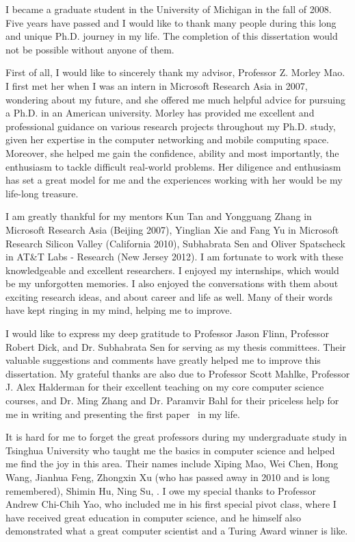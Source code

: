 \startacknowledgementspage

I became a graduate student in the University of Michigan in the fall of 2008. Five years have passed and I would like to thank many people during this long and unique Ph.D. journey in my life. The completion of this dissertation would not be possible without anyone of them.

First of all, I would like to sincerely thank my advisor, Professor Z. Morley Mao. I first met her when I was an intern in Microsoft Research Asia in 2007, wondering about my future, and she offered me much helpful advice for pursuing a Ph.D. in an American university. Morley has provided me excellent and professional guidance on various research projects throughout my Ph.D. study, given her expertise in the computer networking and mobile computing space. Moreover, she helped me gain the confidence, ability and most importantly, the enthusiasm to tackle difficult real-world problems. Her diligence and enthusiasm has set a great model for me and the experiences working with her would be my life-long treasure.

I am greatly thankful for my mentors Kun Tan and Yongguang Zhang in Microsoft Research Asia (Beijing 2007), Yinglian Xie and Fang Yu in Microsoft Research Silicon Valley (California 2010), Subhabrata Sen and Oliver Spatscheck in AT\&T Labs - Research (New Jersey 2012). I am fortunate to work with these knowledgeable and excellent researchers. I enjoyed my internships, which would be my unforgotten memories. I also enjoyed the conversations with them about exciting research ideas, and about career and life as well. Many of their words have kept ringing in my mind, helping me to improve.

I would like to express my deep gratitude to Professor Jason Flinn, Professor Robert Dick, and Dr. Subhabrata Sen for serving as my thesis committees. Their valuable suggestions and comments have greatly helped me to improve this dissertation. My grateful thanks are also due to Professor Scott Mahlke, Professor J. Alex Halderman for their excellent teaching on my core computer science courses, and Dr. Ming Zhang and Dr. Paramvir Bahl for their priceless help for me in writing and presenting the first paper~\cite{mobisys.3gtest} in my life.

It is hard for me to forget the great professors during my undergraduate study in Tsinghua University who taught me the basics in computer science and helped me find the joy in this area. Their names include Xiping Mao, Wei Chen, Hong Wang, Jianhua Feng, Zhongxin Xu (who has passed away in 2010 and is long remembered), Shimin Hu, Ning Su, \etc. I owe my special thanks to Professor Andrew Chi-Chih Yao, who included me in his first special pivot class, where I have received great education in computer science, and he himself also demonstrated what a great computer scientist and a Turing Award winner is like.


